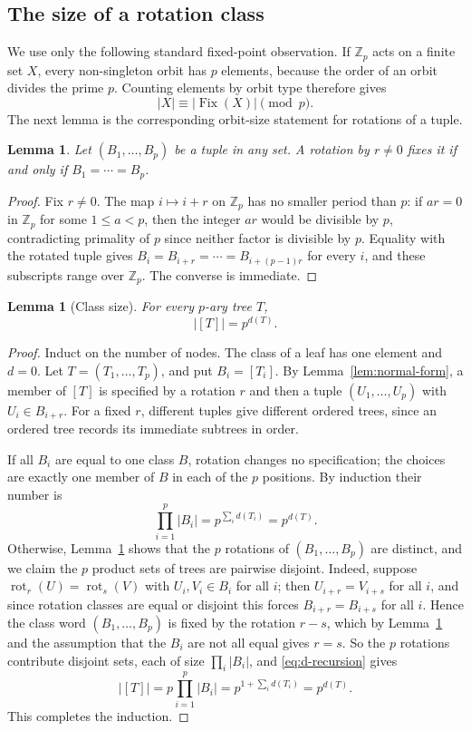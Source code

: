 \documentclass[11pt]{amsart}
\newtheorem{lemma}[theorem]{Lemma}
\theoremstyle{definition}
\theoremstyle{remark}
\newcommand{\Z}{\mathbb Z}
\newcommand{\rot}{\operatorname{rot}}
\DeclareMathOperator{\Fix}{Fix}
\begin{document}
\subsection{The size of a rotation class}
We use only the following standard fixed-point observation.  If $\Z_p$ acts on a finite set $X$, every non-singleton orbit has $p$ elements, because the order of an orbit divides the prime $p$.  Counting elements by orbit type therefore gives
\begin{equation}\label{eq:fixed-points}
 |X|\equiv|\Fix(X)|\pmod p.
\end{equation}
The next lemma is the corresponding orbit-size statement for rotations of a tuple.
\begin{lemma}\label{lem:tuple-rotation}
Let $(B_1,\ldots,B_p)$ be a tuple in any set.  A rotation by $r\ne0$ fixes it if and only if $B_1=\cdots=B_p$.
\end{lemma}
\begin{proof}
Fix $r\ne0$.  The map $i\mapsto i+r$ on $\Z_p$ has no smaller period than $p$: if $ar=0$ in $\Z_p$ for some $1\le a<p$, then the integer $ar$ would be divisible by $p$, contradicting primality of $p$ since neither factor is divisible by $p$.  Equality with the rotated tuple gives $B_i=B_{i+r}=\cdots=B_{i+(p-1)r}$ for every $i$, and these subscripts range over $\Z_p$.  The converse is immediate.
\end{proof}
\begin{lemma}[Class size]\label{lem:class-size}
For every $p$-ary tree $T$,
\[
 |[T]|=p^{d(T)}.
\]
\end{lemma}
\begin{proof}
Induct on the number of nodes.  The class of a leaf has one element and $d=0$.  Let $T=(T_1,\ldots,T_p)$, and put $B_i=[T_i]$.  By Lemma~\ref{lem:normal-form}, a member of $[T]$ is specified by a rotation $r$ and then a tuple $(U_1,\ldots,U_p)$ with $U_i\in B_{i+r}$.  For a fixed $r$, different tuples give different ordered trees, since an ordered tree records its immediate subtrees in order.

If all $B_i$ are equal to one class $B$, rotation changes no specification; the choices are exactly one member of $B$ in each of the $p$ positions.  By induction their number is
\[
 \prod_{i=1}^p|B_i|=p^{\sum_id(T_i)}=p^{d(T)}.
\]
Otherwise, Lemma~\ref{lem:tuple-rotation} shows that the $p$ rotations of $(B_1,\ldots,B_p)$ are distinct, and we claim the $p$ product sets of trees are pairwise disjoint.  Indeed, suppose $\rot_r(U)=\rot_s(V)$ with $U_i,V_i\in B_i$ for all $i$; then $U_{i+r}=V_{i+s}$ for all $i$, and since rotation classes are equal or disjoint this forces $B_{i+r}=B_{i+s}$ for all $i$.  Hence the class word $(B_1,\ldots,B_p)$ is fixed by the rotation $r-s$, which by Lemma~\ref{lem:tuple-rotation} and the assumption that the $B_i$ are not all equal gives $r=s$.  So the $p$ rotations contribute disjoint sets, each of size $\prod_i|B_i|$, and \eqref{eq:d-recursion} gives
\[
 |[T]|=p\prod_{i=1}^p|B_i|=p^{1+\sum_id(T_i)}=p^{d(T)}.
\]
This completes the induction.
\end{proof}
\end{document}
